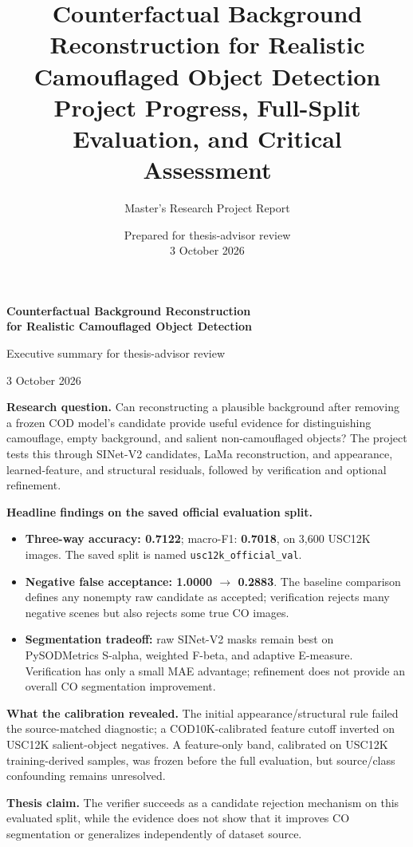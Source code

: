 \documentclass[10pt,a4paper]{article}
\title{Counterfactual Background Reconstruction for Realistic Camouflaged Object Detection\\[0.4em]
\large Project Progress, Full-Split Evaluation, and Critical Assessment}
\author{Master's Research Project Report}
\date{Prepared for thesis-advisor review\\3 October 2026}
\begin{document}
\hypersetup{pageanchor=false}\begin{titlepage}
\centering
{\Large\bfseries Counterfactual Background Reconstruction\\for Realistic Camouflaged Object Detection\par}
\vspace{0.5em}
{\large Executive summary for thesis-advisor review\par}
{\small 3 October 2026\par}
\vspace{1.4em}
\raggedright
\textbf{Research question.} Can reconstructing a plausible background after removing a frozen COD model's candidate provide useful evidence for distinguishing camouflage, empty background, and salient non-camouflaged objects? The project tests this through SINet-V2 candidates, LaMa reconstruction, and appearance, learned-feature, and structural residuals, followed by verification and optional refinement.

\medskip
\textbf{Headline findings on the saved official evaluation split.}
\begin{itemize}[leftmargin=1.4em,itemsep=0.65em]
\item \textbf{Three-way accuracy: 0.7122}; macro-F1: \textbf{0.7018}, on 3,600 USC12K images. The saved split is named \texttt{usc12k\_official\_val}.
\item \textbf{Negative false acceptance: 1.0000 $\rightarrow$ 0.2883}. The baseline comparison defines any nonempty raw candidate as accepted; verification rejects many negative scenes but also rejects some true CO images.
\item \textbf{Segmentation tradeoff:} raw SINet-V2 masks remain best on PySODMetrics S-alpha, weighted F-beta, and adaptive E-measure. Verification has only a small MAE advantage; refinement does not provide an overall CO segmentation improvement.
\end{itemize}
\medskip
\textbf{What the calibration revealed.} The initial appearance/structural rule failed the source-matched diagnostic; a COD10K-calibrated feature cutoff inverted on USC12K salient-object negatives. A feature-only band, calibrated on USC12K training-derived samples, was frozen before the full evaluation, but source/class confounding remains unresolved.

\medskip
\textbf{Thesis claim.} The verifier succeeds as a candidate rejection mechanism on this evaluated split, while the evidence does not show that it improves CO segmentation or generalizes independently of dataset source.


\end{titlepage}
\end{document}
